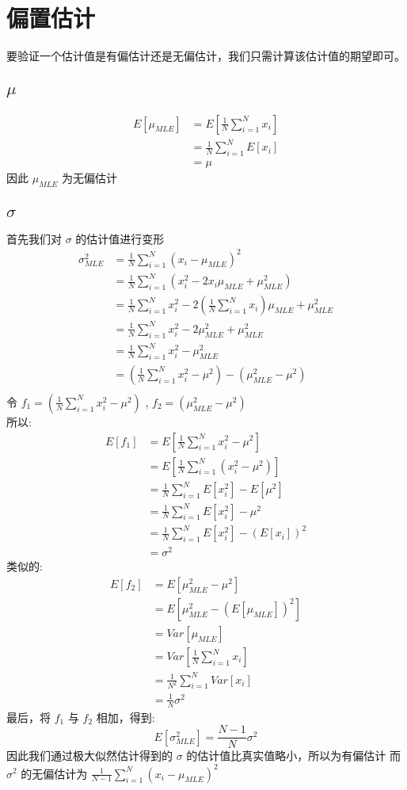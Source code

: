 \documentclass{report}
\begin{document}
\section{偏置估计}
要验证一个估计值是有偏估计还是无偏估计，我们只需计算该估计值的期望即可。
\subsection{$\mu$}
$$
\begin{aligned}
E[\mu_{MLE}]
&=E[\frac{1}{N}\sum_{i=1}^N x_i]\\
&=\frac{1}{N}\sum_{i=1}^N E[x_i]\\
&=\mu
\end{aligned}
$$
因此 $\mu_{MLE}$ 为无偏估计
\subsection{$\sigma$}
首先我们对 $\sigma$ 的估计值进行变形
$$
\begin{aligned}
\sigma_{MLE}^2
&=\frac{1}{N} \sum_{i=1} ^N (x_i - \mu_{MLE})^2\\
&=\frac{1}{N} \sum_{i=1} ^N (x_i^2 - 2x_i\mu_{MLE} + \mu_{MLE}^2)\\
&=\frac{1}{N} \sum_{i=1}^N x_i^2 - 2(\frac{1}{N} \sum_{i=1} ^N x_i) \mu_{MLE} + \mu_{MLE}^2\\
&=\frac{1}{N} \sum_{i=1}^N x_i^2 - 2\mu_{MLE}^2 + \mu_{MLE}^2\\
&=\frac{1}{N} \sum_{i=1}^N x_i^2 - \mu_{MLE}^2\\
&=(\frac{1}{N} \sum_{i=1}^N x_i^2-\mu^2) - (\mu_{MLE}^2-\mu^2)\\
\end{aligned}
$$
令 $f_1=(\frac{1}{N} \sum_{i=1}^N x_i^2-\mu^2)$ , $f_2=(\mu_{MLE}^2-\mu^2)$\\
所以:
$$
\begin{aligned}
E[f_1]
&=E[\frac{1}{N} \sum_{i=1}^N x_i^2 - \mu^2]\\
&=E[\frac{1}{N} \sum_{i=1}^N (x_i^2 - \mu^2)]\\
&=\frac{1}{N} \sum_{i=1}^N E[x_i^2] - E[\mu^2]\\
&=\frac{1}{N} \sum_{i=1}^N E[x_i^2] - \mu^2\\
&=\frac{1}{N} \sum_{i=1}^N E[x_i^2] - (E[x_i])^2\\
&=\sigma^2
\end{aligned}
$$
类似的:
$$
\begin{aligned}
E[f_2]
&=E[\mu_{MLE}^2 - \mu^2]\\
&=E[\mu_{MLE}^2 - (E[\mu_{MLE}])^2]\\
&=Var[\mu_{MLE}]\\
&=Var[\frac{1}{N} \sum_{i=1} ^N x_i]\\
&=\frac{1}{N^2} \sum_{i=1} ^N Var[x_i]\\
&=\frac{1}{N} \sigma^2
\end{aligned}
$$
最后，将 $f_1$ 与 $f_2$ 相加，得到:
$$
E[\sigma_{MLE}^2]=\frac{N-1}{N} \sigma^2
$$
因此我们通过极大似然估计得到的 $\sigma$ 的估计值比真实值略小，所以为有偏估计
而 $\sigma^2$ 的无偏估计为 $\frac{1}{N-1}\sum_{i=1}^N (x_i-\mu_{MLE})^2$
\end{document}
